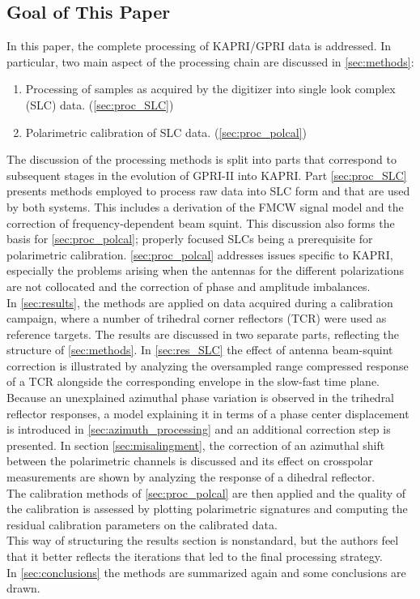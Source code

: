 \subsection{Goal of This Paper}
In this paper, the complete processing of KAPRI/GPRI data is addressed. In particular, two main aspect of the processing chain are discussed in \autoref{sec:methods}:
\begin{enumerate}
	\item Processing of samples as acquired by the digitizer into single look complex (SLC) data. (\autoref{sec:proc_SLC})
	\item Polarimetric calibration of SLC data. (\autoref{sec:proc_polcal})
\end{enumerate}
The discussion of the processing methods is split into parts that correspond to subsequent stages in the evolution of GPRI-II into KAPRI. Part \ref{sec:proc_SLC} presents  methods employed to process raw data into SLC form and that are used by both systems. This includes a derivation of the FMCW signal model and the correction of frequency-dependent beam squint. This discussion also forms the basis for \ref{sec:proc_polcal}; properly focused SLCs being a prerequisite for polarimetric calibration.  \ref{sec:proc_polcal} addresses issues specific to KAPRI, especially the problems arising when the antennas for the different polarizations are not collocated and the correction of phase and amplitude imbalances.\\
In \autoref{sec:results}, the methods are applied on data acquired during a calibration campaign, where a number of trihedral corner reflectors (TCR) were used as reference targets. The results are discussed in two separate parts, reflecting the structure of \autoref{sec:methods}. In \autoref{sec:res_SLC} the effect of antenna beam-squint correction is illustrated by analyzing the oversampled range compressed response of a TCR alongside the corresponding envelope in the slow-fast time plane. Because an unexplained azimuthal phase variation is observed in the trihedral reflector responses, a model explaining it in terms of a phase center displacement is introduced in \autoref{sec:azimuth_processing} and an additional correction step is presented. In section \ref{sec:misalingment}, the correction of an azimuthal shift between the polarimetric channels is discussed and its effect on crosspolar measurements are shown by analyzing the response of a dihedral reflector.\\
The calibration methods of \ref{sec:proc_polcal} are then applied  and the quality of the calibration is assessed by plotting polarimetric signatures and computing the residual calibration parameters on the calibrated data.\\ This way of structuring the results section is nonstandard, but the authors feel that it better reflects the iterations that led to the final processing strategy.\\
In \autoref{sec:conclusions} the methods are summarized again and some conclusions are drawn.